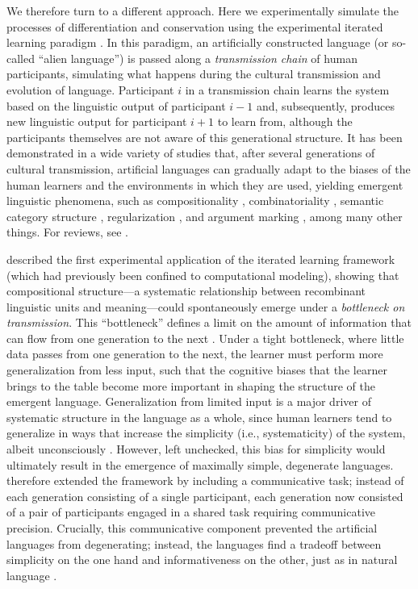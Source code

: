 \documentclass[doc,biblatex]{apa7}
\begin{document}
We therefore turn to a different approach. Here we experimentally simulate the processes of differentiation and conservation using the experimental iterated learning paradigm \parencite{Kirby:2008}. In this paradigm, an artificially constructed language (or so-called ``alien language'') is passed along a \textit{transmission chain} of human participants, simulating what happens during the cultural transmission and evolution of language. Participant $i$ in a transmission chain learns the system based on the linguistic output of participant $i-1$ and, subsequently, produces new linguistic output for participant $i+1$ to learn from, although the participants themselves are not aware of this generational structure. It has been demonstrated in a wide variety of studies that, after several generations of cultural transmission, artificial languages can gradually adapt to the biases of the human learners and the environments in which they are used, yielding emergent linguistic phenomena, such as compositionality \parencite{Beckner:2017, Kirby:2008, Kirby:2015}, combinatoriality \parencite{Verhoef:2015}, semantic category structure \parencite{Carr:2017, Canini:2014, Silvey:2019}, regularization \parencite{Ferdinand:2019, Smith:2010}, and argument marking \parencite{Motamedi:2021}, among many other things. For reviews, see \textcite{Bailes:2023, Kirby:2014, Kirby:2017, Smith:2022, Tamariz:2017}.

\textcite{Kirby:2008} described the first experimental application of the iterated learning framework (which had previously been confined to computational modeling), showing that compositional structure---a systematic relationship between recombinant linguistic units and meaning---could spontaneously emerge under a \textit{bottleneck on transmission}. This ``bottleneck'' defines a limit on the amount of information that can flow from one generation to the next \parencite{Brighton:2002}. Under a tight bottleneck, where little data passes from one generation to the next, the learner must perform more generalization from less input, such that the cognitive biases that the learner brings to the table become more important in shaping the structure of the emergent language. Generalization from limited input is a major driver of systematic structure in the language as a whole, since human learners tend to generalize in ways that increase the simplicity (i.e., systematicity) of the system, albeit unconsciously \parencite{Culbertson:2016}. However, left unchecked, this bias for simplicity would ultimately result in the emergence of maximally simple, degenerate languages. \textcite{Kirby:2015} therefore extended the framework by including a communicative task; instead of each generation consisting of a single participant, each generation now consisted of a pair of participants engaged in a shared task requiring communicative precision. Crucially, this communicative component prevented the artificial languages from degenerating; instead, the languages find a tradeoff between simplicity on the one hand and informativeness on the other, just as in natural language \parencite{Mollica:2021, KempRegier:2012, Kemp:2018, Regier:2015, Zaslavsky:2018}.
\end{document}
